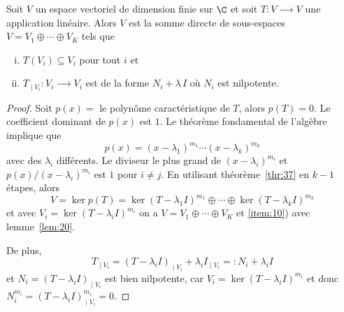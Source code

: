 \begin{lemma}
  \label{lem:19}
  Soit $V$ un espace vectoriel de dimension finie sur $\C$ et soit $T\colon V ⟶ V$ une application linéaire. Alors $V$ est la somme directe de sous-espaces   $V = V_1 ⊕ \cdots ⊕ V_K$  tels que 
  \begin{enumerate}[i)]
  \item $T(V_i) ⊆ V_i$ pour tout $i$ et \label{item:10}
  \item $T_{∣V_i} \colon V_i ⟶ V_i$
    est de la forme $N_i + λ \, I$ où $N_i$ est nilpotente. \label{item:11}
  \end{enumerate}
\end{lemma}

\begin{proof}
Soit $p(x) =$ le polyn{\^o}me caractéristique  de $T$, alors $p(T) = 0$.
Le coefficient dominant de $p(x)$ est $1$.   Le théorème fondamental de l'algèbre implique que 
\begin{displaymath}
  p(x) = ( x - λ_1)^{m_1} \cdots ( x - λ_k)^{m_k} 
\end{displaymath}
avec des $λ_i$ différents. 
Le diviseur le plus grand de $( x - λ_i)^{m_i}$ et $p(x) / ( x - λ_i)^{m_i}$ est $1$ pour $i ≠ j$. En utilisant théorème~\ref{thr:37} en $k-1$ étapes, alors 
\begin{displaymath} 
V =   \ker p(T) = \ker (T - λ_1I)^{m_1} ⊕  \cdots ⊕ \ker( T - λ_kI)^{m_k}
\end{displaymath}
et avec $V_i = \ker( T - λ_iI)^{m_i}$ on a $V = V_1 ⊕ \cdots ⊕ V_K$  et \ref{item:10}) avec lemme~\ref{lem:20}. \newline

De plus, $$T_{∣V_i} = (T - λ_iI)_{∣V_i} + λ_iI_{∣V_i} =\colon N_i + λ_iI$$ et $N_i = (T - λ_iI)_{∣V_i}$ est bien nilpotente, car $V_i = \ker( T - λ_iI)^{m_i}$ et donc $N_i^{m_i} = (T - λ_iI)^{m_i}_{∣V_i} = 0$.
\end{proof}


